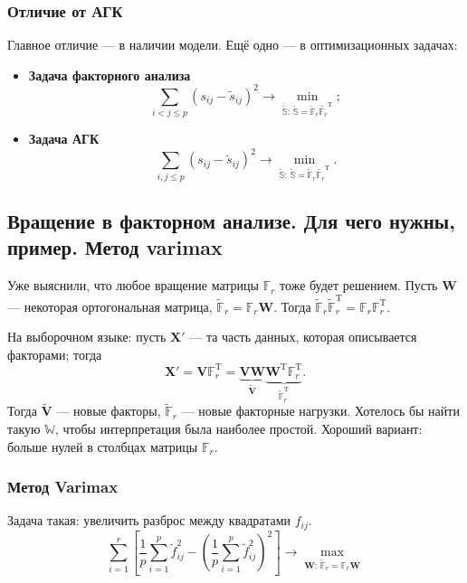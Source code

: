 \documentclass[12pt,a4paper,final]{article}
\newcommand{\1}{\mathds{1}}
\begin{document}
\subsubsection*{Отличие от АГК}

Главное отличие --- в наличии модели.
Ещё одно --- в оптимизационных задачах:
\begin{itemize}
\item \textbf{Задача факторного анализа}
$$
\sum_{i<j\leqslant p}(s_{ij} - \tilde{s}_{ij})^2 \rightarrow \min_{\tilde{\mathbb{S}}:\, \tilde{\mathbb{S}} = \tilde{\mathbb{F}}_r \tilde{\mathbb{F}_r}^\mathrm{T}};
$$
\item \textbf{Задача АГК}
$$
\sum_{i,j \leqslant p}(s_{ij} - \tilde{s}_{ij})^2 \rightarrow \min_{\tilde{\mathbb{S}}:\, \tilde{\mathbb{S}} = \tilde{\mathbb{F}}_r \tilde{\mathbb{F}_r}^\mathrm{T}}.
$$

\end{itemize}

\subsection{Вращение в факторном анализе. Для чего нужны, пример. Метод varimax}

Уже выяснили, что любое вращение матрицы $\mathbb{F}_r$ тоже будет решением. Пусть $\bm W$ --- некоторая ортогональная матрица, $\tilde{\mathbb{F}}_r = \mathbb{F}_r \bm{W}$. Тогда
$\tilde{\mathbb{F}}_r \tilde{\mathbb{F}}_r^\mathrm{T} = {\mathbb{F}}_r {\mathbb{F}}_r^\mathrm{T}$.

На выборочном языке: пусть $\bm X'$ --- та часть данных, которая описывается факторами; тогда
$$
\bm X' = \bm V \mathbb{F}_r^\mathrm{T} = \underbrace{\bm V\bm{W}}_{\tilde{\bm{V}}} \underbrace{\bm{W}^\mathrm{T} \mathbb{F}_r^\mathrm{T}}_{\tilde{\mathbb{F}}_r^\mathrm{T}}.
$$
Тогда $\tilde{\bm{V}}$ --- новые факторы, $\tilde{\mathbb{F}}_r$ --- новые факторные нагрузки. Хотелось бы найти такую $\mathbb{W}$, чтобы интерпретация была наиболее простой. Хороший вариант: больше нулей в столбцах матрицы $\mathbb{F}_r$.

\subsubsection*{Метод Varimax}

Задача такая: увеличить разброс между квадратами $f_{ij}.$ 
$$
\sum_{i = 1}^r \left[ \frac{1}{p}\sum_{i = 1}^p \tilde{f}_{ij}^2 - \left( \frac{1}{p} \sum_{i = 1}^p \tilde{f}_{ij}^2 \right)^2 \right] \rightarrow \max_{{\bm W}:\, \tilde{\mathbb{F}}_r = \mathbb{F}_r \bm W}
$$
\end{document}
